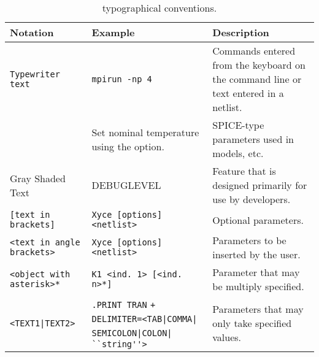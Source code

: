 \begin{table}[htbp]
    \caption{\Xyce{} typographical conventions.}\label{typog}
  \begin{tabularx}{\linewidth}{|Y|Y|Y|}
     \color{white}\bf Notation & \color{white}\bf
    Example & \color{white}\bf Description \\ \hline

    \texttt{Typewriter text} & \texttt{mpirun -np 4}
    & Commands entered
    from the keyboard on the command line or text entered in a netlist. \\
    \hline

     & Set nominal temperature using the
     option. & SPICE-type parameters used in models, etc. \\
    \hline

     Gray Shaded Text &  DEBUGLEVEL
    & Feature that is designed primarily for use by \Xyce{}
    developers. \\ \hline

    \texttt{[text in brackets]} & \texttt{Xyce [options] <netlist>} & Optional parameters. \\ \hline

    \texttt{<text in angle brackets>} & \texttt{Xyce [options] <netlist>} &
    Parameters to be inserted by the user. \\ \hline

    \texttt{<object with asterisk>*} & \texttt{K1 <ind. 1> [<ind. n>*]} &
    Parameter that may be multiply specified. \\ \hline

    \texttt{<TEXT1|TEXT2>}&
    \texttt{.PRINT TRAN}
    \verb-+ DELIMITER=<TAB|COMMA|-
    \verb- SEMICOLON|COLON|-
    \verb- ``string''>- & Parameters that may only take specified values. \\ \hline

  \end{tabularx}
\end{table}
